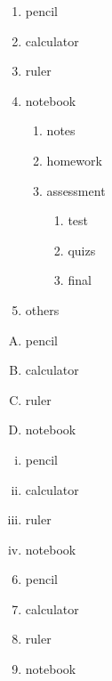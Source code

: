 \documentclass[12pt]{article}
\begin{document}
\begin{enumerate}
\item pencil
\item calculator
\item ruler
\item notebook
	\begin{enumerate}
	\item notes
	\item homework
	\item assessment
		\begin{enumerate}
		\item test
		\item quizs
		\item final
		\end{enumerate}
	\end{enumerate}
\item others
\end{enumerate}
\vspace{1cm}

\begin{enumerate}[A.]

\item pencil
\item calculator
\item ruler
\item notebook

\end{enumerate}
\vspace{1cm}

\begin{enumerate}[i.]

\item pencil
\item calculator
\item ruler
\item notebook

\end{enumerate}
\vspace{1cm}

\begin{enumerate}\setcounter{enumi}{5}%
\item pencil
\item calculator
\item ruler
\item notebook
\end{enumerate}
\end{document}

